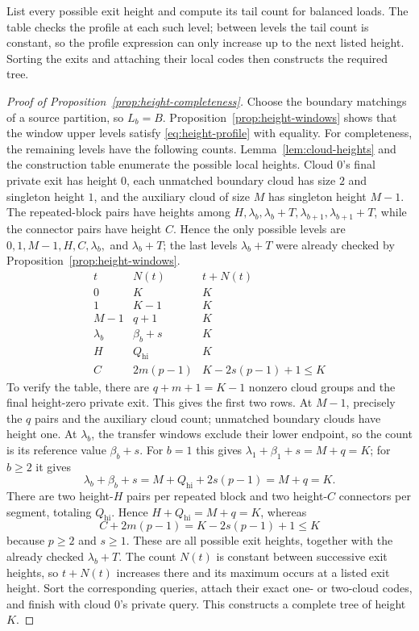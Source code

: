 \begin{proofstrategy}
List every possible exit height and compute its tail count for balanced
loads. The table checks the profile at each such level; between levels
the tail count is constant, so the profile expression can only increase
up to the next listed height. Sorting the exits and attaching their
local codes then constructs the required tree.
\end{proofstrategy}
\begin{proof}[Proof of Proposition~\ref{prop:height-completeness}]
Choose the boundary matchings of a source partition, so $L_b=B$.
Proposition~\ref{prop:height-windows} shows that the window upper
levels satisfy \eqref{eq:height-profile} with equality.
For completeness, the remaining levels have the following counts.
Lemma~\ref{lem:cloud-heights} and the construction table enumerate
the possible local heights. Cloud $0$'s final private exit has height
$0$, each unmatched boundary cloud has size $2$ and singleton height
$1$, and the auxiliary cloud of size $M$ has singleton height $M-1$.
The repeated-block pairs have heights among
$H,\lambda_b,\lambda_b+T,\lambda_{b+1},\lambda_{b+1}+T$,
while the connector pairs have height $C$. Hence the only possible
levels are $0,1,M-1,H,C,\lambda_b,$ and $\lambda_b+T$; the last
levels $\lambda_b+T$ were already checked by
Proposition~\ref{prop:height-windows}.
\[
 \begin{array}{c|c|c}
 t&N(t)&t+N(t)\\ \hline
 0&K&K\\
 1&K-1&K\\
 M-1&q+1&K\\
 \lambda_b&\beta_b+s&K\\
 H&Q_{\mathrm{hi}}&K\\
 C&2m(p-1)&K-2s(p-1)+1\le K
 \end{array}
\]
To verify the table, there are $q+m+1=K-1$ nonzero cloud groups
and the final height-zero private exit. This gives the first two rows.
At $M-1$, precisely the $q$ pairs and the auxiliary cloud count;
unmatched boundary clouds have height one. At $\lambda_b$, the
transfer windows exclude their lower endpoint, so the count is its
reference value $\beta_b+s$. For $b=1$ this gives
$\lambda_1+\beta_1+s=M+q=K$; for $b\ge2$ it gives
\[
 \lambda_b+\beta_b+s
 =M+Q_{\mathrm{hi}}+2s(p-1)=M+q=K.
\]
There are two height-$H$ pairs per repeated block and two height-$C$
connectors per segment, totaling $Q_{\mathrm{hi}}$. Hence
$H+Q_{\mathrm{hi}}=M+q=K$, whereas
\[
 C+2m(p-1)=K-2s(p-1)+1\le K
\]
because $p\ge2$ and $s\ge1$. These are all possible exit heights,
together with the already checked $\lambda_b+T$. The count $N(t)$ is constant between
successive exit heights, so $t+N(t)$ increases there and its maximum
occurs at a listed exit height. Sort the corresponding queries, attach
their exact one- or two-cloud codes, and finish with cloud $0$'s
private query. This constructs a complete tree of height $K$.
\end{proof}

